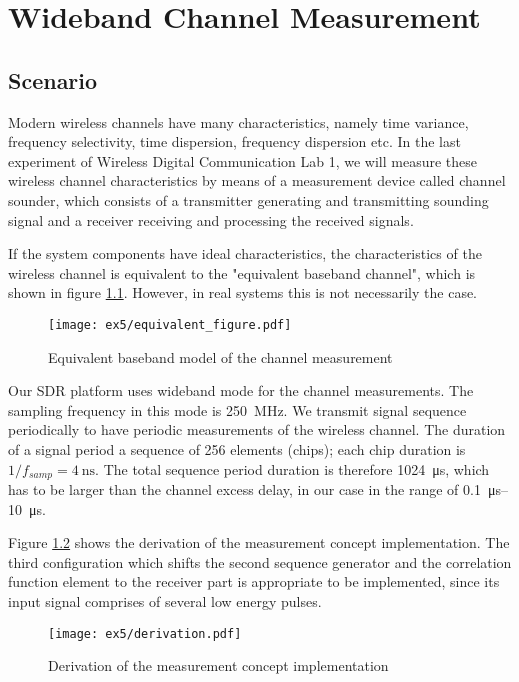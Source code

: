 \chapter{Wideband Channel Measurement}
\section{Scenario}
Modern wireless channels have many characteristics, namely time variance, frequency selectivity, time dispersion, frequency dispersion etc. In the last experiment of Wireless Digital Communication Lab 1, we will measure these wireless channel characteristics by means of a measurement device called channel sounder, which consists of a transmitter generating and transmitting sounding signal and a receiver receiving and processing the received signals. 

If the system components have ideal characteristics, the characteristics of the wireless channel is equivalent to the "equivalent baseband channel", which is shown in figure \ref{fig:ex5:equi_fig}. However, in real systems this is not necessarily the case.

\begin{figure}[H]
	\begin{center}
		\texttt{[image: ex5/equivalent\_figure.pdf]}
		\caption{Equivalent baseband model of the channel measurement \cite{e5}}
		\label{fig:ex5:equi_fig}
	\end{center}
\end{figure}  

Our SDR platform uses wideband mode for the channel measurements. The sampling frequency in this mode is \SI{250}{\mega \hertz}. We transmit signal sequence periodically to have periodic measurements of the wireless channel. The duration of a signal period a sequence of 256 elements (chips); each chip duration is $1/f_{samp} = \SI{4}{\nano \second}$. The total sequence period duration is therefore \SI{1024}{\micro \second}, which has to be larger than the channel excess delay, in our case in the range of \SIrange{0.1}{10}{\micro \second}.

Figure \ref{fig:ex5:derivation} shows the derivation of the measurement concept implementation. The third configuration which shifts the second sequence generator and the correlation function element to the receiver part is appropriate to be implemented, since its input signal comprises of several low energy pulses.

\begin{figure}[H]
	\begin{center}
		\texttt{[image: ex5/derivation.pdf]}
		\caption{Derivation of the measurement concept implementation \cite{e5}}
		\label{fig:ex5:derivation}
	\end{center}
\end{figure}

